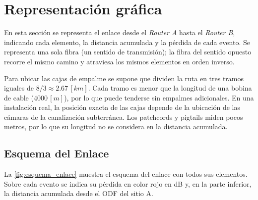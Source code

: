 \section{Representación gráfica}
\label{sec_4}
En esta sección se representa el enlace desde el \textit{Router A} hasta el \textit{Router B}, indicando cada elemento, la distancia acumulada y la pérdida de cada evento. Se representa una sola fibra (un sentido de transmisión); la fibra del sentido opuesto recorre el mismo camino y atraviesa los mismos elementos en orden inverso.

Para ubicar las cajas de empalme se supone que dividen la ruta en tres tramos iguales de $8/3 \approx 2.67 \, [km]$. Cada tramo es menor que la longitud de una bobina de cable ($4000 \, [m]$), por lo que puede tenderse sin empalmes adicionales. En una instalación real, la posición exacta de las cajas depende de la ubicación de las cámaras de la canalización subterránea. Los patchcords y pigtails miden pocos metros, por lo que su longitud no se considera en la distancia acumulada.


\subsection{Esquema del Enlace}
\label{sec_4.1}
La \autoref{fig:esquema_enlace} muestra el esquema del enlace con todos sus elementos. Sobre cada evento se indica su pérdida en color rojo en dB y, en la parte inferior, la distancia acumulada desde el ODF del sitio A.

